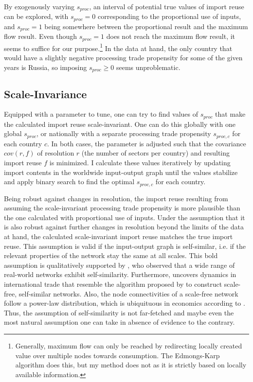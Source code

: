 \documentclass[english]{uzhpub}
\begin{document}
By exogenously varying $s_{proc}$, an interval of potential true values of import reuse can be explored, with $s_{proc}=0$ corresponding to the proportional use of inputs, and $s_{proc}=1$ being somewhere between the proportional result and the maximum flow result. Even though $s_{proc}=1$ does not reach the maximum flow result, it seems to suffice for our purpose.\footnote{Generally, maximum flow can only be reached by redirecting locally created value over multiple nodes towards consumption. The Edmongs-Karp algorithm does this, but my method does not as it is strictly based on locally available information.} In the data at hand, the only country that would have a slightly negative processing trade propensity for some of the given years is Russia, so imposing $s_{proc}\geq0$ seems unproblematic.

\subsection{Scale-Invariance}
\label{met:scale-invariance}
Equipped with a parameter to tune, one can try to find values of $s_{proc}$ that make the calculated import reuse scale-invariant. One can do this globally with one global $s_{proc}$, or nationally with a separate processing trade propensity $s_{proc, c}$ for each country $c$. In both cases, the parameter is adjusted such that the covariance $cov(r, f)$ of resolution $r$ (the number of sectors per country) and resulting import reuse $f$ is minimized. I calculate these values iteratively by updating import contents in the worldwide input-output graph until the values stabilize and apply binary search to find the optimal $s_{proc, c}$ for each country.

Being robust against changes in resolution, the import reuse resulting from assuming the scale-invariant processing trade propensity is more plausible than the one calculated with proportional use of inputs. Under the assumption that it is also robust against further changes in resolution beyond the limits of the data at hand, the calculated scale-invariant import reuse matches the true import reuse. This assumption is valid if the input-output graph is self-similar, i.e. if the relevant properties of the network stay the same at all scales. This bold assumption is qualitatively supported by \cite{song2005self}, who observed that a wide range of real-world networks exhibit self-similarity. Furthermore, \cite{chaney2014network} uncovers dynamics in international trade that resemble the algorithm proposed by \cite{barabasi1999emergence} to construct scale-free, self-similar networks. Also, the node connectivities of a scale-free network follow a power-law distribution, which is ubiquituous in economics according to \citep{gabaix2016power}. Thus, the assumption of self-similarity is not far-fetched and maybe even the most natural assumption one can take in absence of evidence to the contrary.
\end{document}
